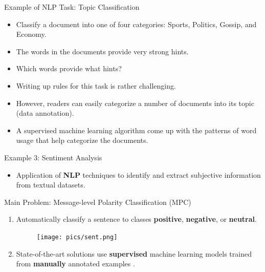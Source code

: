\documentclass[handout]{beamer}
\begin{document}
\begin{frame}{Example of NLP Task: Topic Classification}
\begin{scriptsize}
\begin{itemize}
\item Classify a document into one of four categories: Sports, Politics, Gossip, and Economy. 
\item The words in the documents provide very strong hints.
\item Which words provide what hints? 
\item Writing up rules for this task is rather challenging. 
\item However, readers can easily categorize a number of documents into its topic (data annotation).
\item A supervised machine learning algorithm come up with the patterns of word usage that help categorize the documents.
\end{itemize}
\end{scriptsize}
\end{frame}


\begin{frame}{Example 3: Sentiment Analysis}
\begin{scriptsize}\begin{itemize}
 \item Application of \textbf{NLP} techniques to identify and extract subjective information from textual datasets.
\end{itemize}

\begin{block}{Main Problem: Message-level Polarity Classification (MPC)}
  \begin{enumerate}
   \item Automatically classify a sentence to classes \textcolor[rgb]{0.00,0.00,1.00}{\textbf{positive}}, \textcolor[rgb]{1.00,0.00,0.00}{\textbf{negative}}, or \textcolor[rgb]{0.00,1.00,0.00}{\textbf{neutral}}. 
   
     \begin{figure}[h]
        	\texttt{[image: pics/sent.png]}
        \end{figure}
   
   \item State-of-the-art solutions use \textbf{supervised} machine learning models trained from \textbf{manually} annotated examples \cite{Mohammad2013}.
  \end{enumerate} 
\end{block}

\end{scriptsize}

\end{frame}
\end{document}
